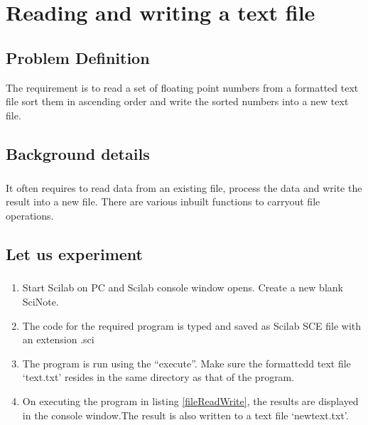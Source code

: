 \chapter [Reading and writing a text file]{Reading and writing a text file}


\section*{Problem Definition}

The requirement is to read a set of floating point numbers from a formatted text file sort them in ascending order and write the sorted numbers into a new text file.

\section*{Background details}
\paragraph{}


It often requires to read data from an existing file, process the data and write the result into a new file. There are various inbuilt functions to carryout file operations.

\paragraph{}

\section*{Let us experiment}

\paragraph{}
\begin{enumerate}
\item
Start Scilab on PC and Scilab console window opens. Create a new blank SciNote.
\item
The code for the required program is typed and saved as Scilab SCE file with an extension .sci
\item
The program is run using the “execute”. Make sure the formattedd text file `text.txt' resides in the same directory as that of the program.
\item
On executing the program in listing \ref{fileReadWrite}, the results are displayed in the console window.The result is also written to a text file `newtext.txt'.
\end{enumerate}

